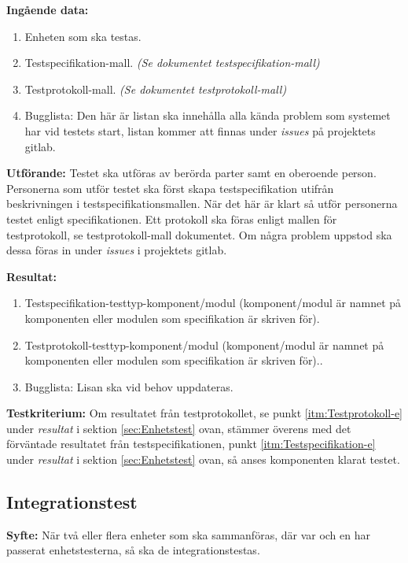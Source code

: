 \documentclass[a4paper,10pt]{article}
\begin{document}
  \textbf{Ingående data:}
        \begin{enumerate}
            \item Enheten som ska testas.
            \item Testspecifikation-mall. \emph{(Se dokumentet testspecifikation-mall)}
            \item Testprotokoll-mall. \emph{(Se dokumentet testprotokoll-mall)}
            \item Bugglista: Den här är listan ska innehålla alla kända problem som systemet har vid testets start, listan kommer att finnas under \emph{issues} på projektets gitlab.
        \end{enumerate}

    \textbf{Utförande:} Testet ska utföras av berörda parter samt en oberoende person. Personerna som utför testet ska först skapa testspecifikation utifrån beskrivningen i testspecifikationsmallen. När det här är klart så utför personerna testet enligt specifikationen. Ett protokoll ska föras enligt mallen för testprotokoll, se testprotokoll-mall dokumentet. Om några problem uppstod ska dessa föras in under \emph{issues} i projektets gitlab.

    \textbf{Resultat:}
        \begin{enumerate}
            \item \label{itm:Testspecifikation-e} Testspecifikation-testtyp-komponent/modul (komponent/modul är namnet på komponenten eller modulen som specifikation är skriven för).
            \item \label{itm:Testprotokoll-e} Testprotokoll-testtyp-komponent/modul (komponent/modul är namnet på komponenten eller modulen som specifikation är skriven för)..
            \item Bugglista: Lisan ska vid behov uppdateras.
        \end{enumerate}
    \textbf{Testkriterium:} Om resultatet från testprotokollet, se punkt \ref{itm:Testprotokoll-e} under \emph{resultat} i sektion \ref{sec:Enhetstest} ovan, stämmer överens med det förväntade resultatet från testspecifikationen, punkt \ref{itm:Testspecifikation-e} under \emph{resultat} i sektion \ref{sec:Enhetstest} ovan, så anses komponenten klarat testet.

\subsection{Integrationstest}
\label{sec:Integrationstest}
\textbf{Syfte:}
När två eller flera enheter som ska sammanföras, där var och en har passerat enhetstesterna, så ska de integrationstestas.
\end{document}
